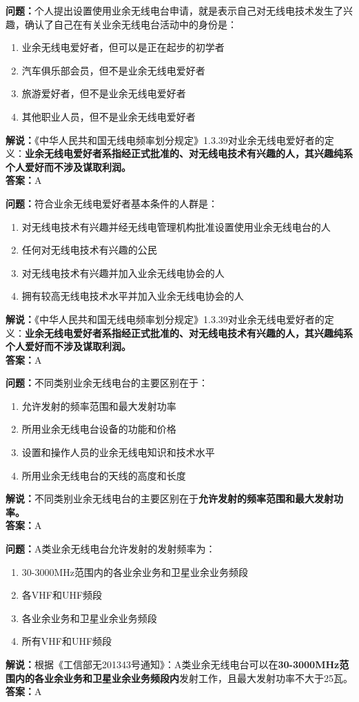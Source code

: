 \textbf{问题：}个人提出设置使用业余无线电台申请，就是表示自己对无线电技术发生了兴趣，确认了自己在有关业余无线电台活动中的身份是：
\begin{enumerate}[label=\Alph*), leftmargin=1cm]
	\item 业余无线电爱好者，但可以是正在起步的初学者
	\item 汽车俱乐部会员，但不是业余无线电爱好者
	\item 旅游爱好者，但不是业余无线电爱好者
	\item 其他职业人员，但不是业余无线电爱好者
\end{enumerate}
\textbf{解说：}《中华人民共和国无线电频率划分规定》1.3.39对业余无线电爱好者的定义：\textbf{业余无线电爱好者系指经正式批准的、对无线电技术有兴趣的人，其兴趣纯系个人爱好而不涉及谋取利润。}\\\textbf{答案：}A

\textbf{问题：}符合业余无线电爱好者基本条件的人群是：
\begin{enumerate}[label=\Alph*), leftmargin=1cm]
	\item 对无线电技术有兴趣并经无线电管理机构批准设置使用业余无线电台的人
	\item 任何对无线电技术有兴趣的公民
	\item 对无线电技术有兴趣并加入业余无线电协会的人
	\item 拥有较高无线电技术水平并加入业余无线电协会的人
\end{enumerate}
\textbf{解说：}《中华人民共和国无线电频率划分规定》1.3.39对业余无线电爱好者的定义：\textbf{业余无线电爱好者系指经正式批准的、对无线电技术有兴趣的人，其兴趣纯系个人爱好而不涉及谋取利润。}\\\textbf{答案：}A

\textbf{问题：}不同类别业余无线电台的主要区别在于：
\begin{enumerate}[label=\Alph*), leftmargin=1cm]
	\item 允许发射的频率范围和最大发射功率
	\item 所用业余无线电台设备的功能和价格
	\item 设置和操作人员的业余无线电知识和技术水平
	\item 所用业余无线电台的天线的高度和长度
\end{enumerate}
\textbf{解说：}不同类别业余无线电台的主要区别在于\textbf{允许发射的频率范围和最大发射功率。}\\\textbf{答案：}A

\textbf{问题：}A类业余无线电台允许发射的发射频率为：
\begin{enumerate}[label=\Alph*), leftmargin=1cm]
	\item 30-3000MHz范围内的各业余业务和卫星业余业务频段
	\item 各VHF和UHF频段
	\item 各业余业务和卫星业余业务频段
	\item 所有VHF和UHF频段
\end{enumerate}
\textbf{解说：}根据《工信部无201343号通知》：A类业余无线电台可以在\textbf{30-3000MHz范围内的各业余业务和卫星业余业务频段内}发射工作，且最大发射功率不大于25瓦。\\\textbf{答案：}A

